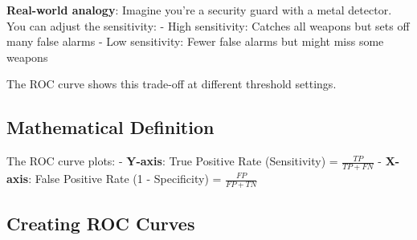 \documentclass[
  11pt,
  letterpaper,
  oneside]{book}
\begin{document}
\textbf{Real-world analogy}: Imagine you're a security guard with a
metal detector. You can adjust the sensitivity: - High sensitivity:
Catches all weapons but sets off many false alarms - Low sensitivity:
Fewer false alarms but might miss some weapons

The ROC curve shows this trade-off at different threshold settings.

\subsection{Mathematical Definition}\label{mathematical-definition}

The ROC curve plots: - \textbf{Y-axis}: True Positive Rate (Sensitivity)
= \(\frac{TP}{TP + FN}\) - \textbf{X-axis}: False Positive Rate (1 -
Specificity) = \(\frac{FP}{FP + TN}\)

\subsection{Creating ROC Curves}\label{creating-roc-curves}
\end{document}
